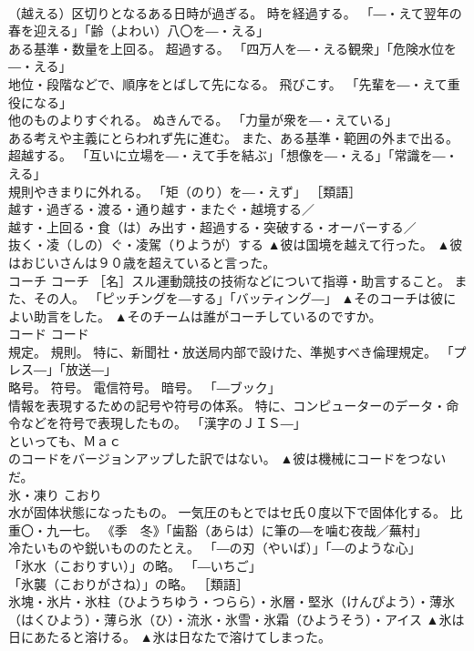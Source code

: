 \documentclass[8pt]{extreport}
\begin{document}
\begin{CJK}{UTF8}{min}
\\	（越える）区切りとなるある日時が過ぎる。 時を経過する。 「―・えて翌年の春を迎える」「齢（よわい）八〇を―・える」 
\\	ある基準・数量を上回る。 超過する。 「四万人を―・える観衆」「危険水位を―・える」 
\\	地位・段階などで、順序をとばして先になる。 飛びこす。 「先輩を―・えて重役になる」 
\\	他のものよりすぐれる。 ぬきんでる。 「力量が衆を―・えている」 
\\	ある考えや主義にとらわれず先に進む。 また、ある基準・範囲の外まで出る。 超越する。 「互いに立場を―・えて手を結ぶ」「想像を―・える」「常識を―・える」 
\\	規則やきまりに外れる。 「矩（のり）を―・えず」 ［類語］
\\	越す・過ぎる・渡る・通り越す・またぐ・越境する／
\\	越す・上回る・食（は）み出す・超過する・突破する・オーバーする／
\\	抜く・凌（しの）ぐ・凌駕（りようが）する	▲彼は国境を越えて行った。 ▲彼はおじいさんは９０歳を超えていると言った。
\\	コーチ	コーチ	［名］スル運動競技の技術などについて指導・助言すること。 また、その人。 「ピッチングを―する」「バッティング―」	▲そのコーチは彼によい助言をした。 ▲そのチームは誰がコーチしているのですか。
\\	コード	コード	
\\	規定。 規則。 特に、新聞社・放送局内部で設けた、準拠すべき倫理規定。 「プレス―」「放送―」 
\\	略号。 符号。 電信符号。 暗号。 「―ブック」 
\\	情報を表現するための記号や符号の体系。 特に、コンピューターのデータ・命令などを符号で表現したもの。 「漢字のＪＩＳ―」	
\\	といっても、Ｍａｃ 
\\	のコードをバージョンアップした訳ではない。 ▲彼は機械にコードをつないだ。
\\	氷・凍り	こおり	
\\	水が固体状態になったもの。 一気圧のもとではセ氏０度以下で固体化する。 比重〇・九一七。 《季　冬》「歯豁（あらは）に筆の―を噛む夜哉／蕪村」 
\\	冷たいものや鋭いもののたとえ。 「―の刃（やいば）」「―のような心」 
\\	「氷水（こおりすい）」の略。 「―いちご」 
\\	「氷襲（こおりがさね）」の略。 ［類語］
\\	氷塊・氷片・氷柱（ひようちゆう・つらら）・氷層・堅氷（けんぴよう）・薄氷（はくひよう）・薄ら氷（ひ）・流氷・氷雪・氷霜（ひようそう）・アイス	▲氷は日にあたると溶ける。 ▲氷は日なたで溶けてしまった。

\end{CJK}
\end{document}
